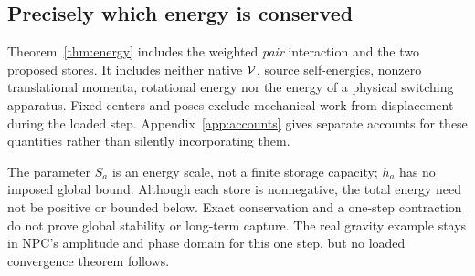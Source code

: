 \subsection{Precisely which energy is conserved}
Theorem~\ref{thm:energy} includes the weighted \emph{pair} interaction and the two proposed stores. It includes neither native \(\mathcal V\), source self-energies, nonzero translational momenta, rotational energy nor the energy of a physical switching apparatus. Fixed centers and poses exclude mechanical work from displacement during the loaded step. Appendix~\ref{app:accounts} gives separate accounts for these quantities rather than silently incorporating them.

The parameter \(S_a\) is an energy scale, not a finite storage capacity; \(h_a\) has no imposed global bound. Although each store is nonnegative, the total energy need not be positive or bounded below. Exact conservation and a one-step contraction do not prove global stability or long-term capture. The real gravity example stays in NPC's amplitude and phase domain for this one step, but no loaded convergence theorem follows.

